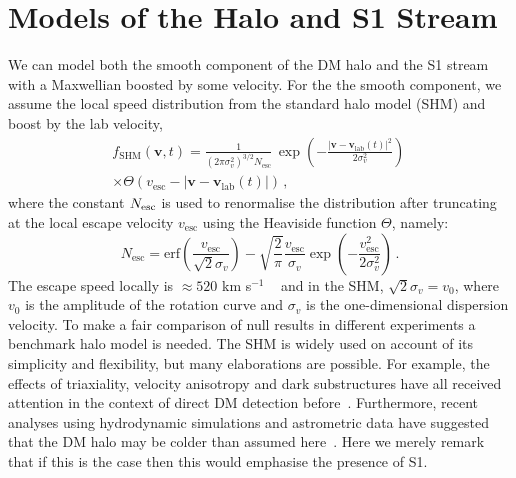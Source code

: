 \documentclass[prd,10pt,twocolumn,showpacs,nofootinbib,aps,superscriptaddress,preprintnumbers]{revtex4-1}
\newcommand{\vesc}{v_\mathrm{esc}}
\newcommand{\erf}{\mathrm{erf}}
\begin{document}
\section{Models of the Halo and S1 Stream}\label{sec:halomodel}

We can model both the smooth component of the DM halo and the S1 stream
with a Maxwellian boosted by some velocity. For the the smooth
component, we assume the local speed distribution from the standard
halo model (SHM) and boost by the lab velocity,
%
\begin{align}\label{eq:shm}
f_\mathrm{SHM}(\mathbf{v},t) = \frac{1}{(2\pi
  \sigma_v^2)^{3/2}N_\mathrm{esc}} \, \exp \left( - \frac{|\mathbf{v}
  - \mathbf{v}_\textrm{lab}(t)|^2}{2\sigma_v^2}\right) \,
\nonumber\\ \times \Theta (\vesc - |\mathbf{v} -
\mathbf{v}_\textrm{lab}(t)|)\,,
\end{align}
% 
where the constant $N_{\rm esc}$ is used to renormalise the distribution 
after truncating at the local escape velocity $\vesc$ using the
Heaviside function $\Theta$, namely:
%
\begin{equation}
N_\mathrm{esc} = \erf \left( \frac{\vesc}{\sqrt{2}\sigma_v}\right) -
\sqrt{\frac{2}{\pi}} \frac{\vesc}{\sigma_v} \exp \left(
-\frac{\vesc^2}{2\sigma_v^2} \right)\,.
\end{equation}
%
The escape speed locally is $\approx 520$ km s$^{-1}$
~\cite{Williams:2017} and in the SHM, $\sqrt{2} \sigma_v = v_0$, where
$v_0$ is the amplitude of the rotation curve and $\sigma_v$ is the one-dimensional dispersion velocity. To make a fair
comparison of null results in different experiments a benchmark halo
model is needed. The SHM is widely used on account of its simplicity
and flexibility, but many elaborations are possible. For example, the
effects of triaxiality, velocity anisotropy and dark substructures
have all received attention in the context of direct DM detection
before~\cite{Ca00,Savage:2006qr,Bruch:2008rx,MarchRussell:2008dy,Lisanti:2010qx,Lisanti:2011as,Lee:2012pf,Vergados:2012xn,Billard:2012qu,O'Hare:2014oxa,Foster:2017hbq,OHare:2017yze,Fornasa:2013iaa,Bozorgnia:2013pua,Kavanagh:2016xfi}. 
Furthermore, recent analyses using hydrodynamic simulations and astrometric data
have suggested that the DM halo may be colder than assumed
here~\cite{Bozorgnia:2016ogo,Lentz:2017aay,Sloane:2016kyi,Herzog-Arbeitman:2017zbm,Necib:2018iwb}. Here
we merely remark that if this is the case then this would emphasise
the presence of S1.
\end{document}
